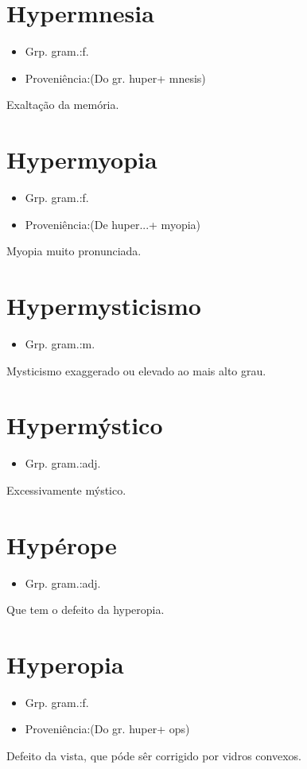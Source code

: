 \documentclass{article}
\begin{document}
\section{Hypermnesia}
\begin{itemize}
\item {Grp. gram.:f.}
\end{itemize}
\begin{itemize}
\item {Proveniência:(Do gr. \textunderscore huper\textunderscore  + \textunderscore mnesis\textunderscore )}
\end{itemize}
Exaltação da memória.
\section{Hypermyopia}
\begin{itemize}
\item {Grp. gram.:f.}
\end{itemize}
\begin{itemize}
\item {Proveniência:(De \textunderscore huper...\textunderscore  + \textunderscore myopia\textunderscore )}
\end{itemize}
Myopia muito pronunciada.
\section{Hypermysticismo}
\begin{itemize}
\item {Grp. gram.:m.}
\end{itemize}
Mysticismo exaggerado ou elevado ao mais alto grau.
\section{Hypermýstico}
\begin{itemize}
\item {Grp. gram.:adj.}
\end{itemize}
Excessivamente mýstico.
\section{Hypérope}
\begin{itemize}
\item {Grp. gram.:adj.}
\end{itemize}
Que tem o defeito da hyperopia.
\section{Hyperopia}
\begin{itemize}
\item {Grp. gram.:f.}
\end{itemize}
\begin{itemize}
\item {Proveniência:(Do gr. \textunderscore huper\textunderscore  + \textunderscore ops\textunderscore )}
\end{itemize}
Defeito da vista, que póde sêr corrigido por vidros convexos.
\end{document}
